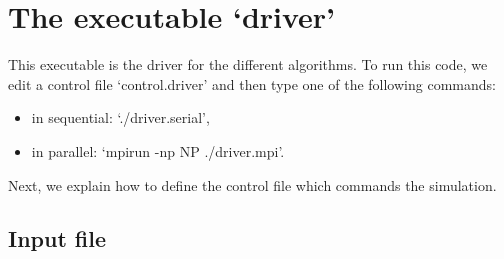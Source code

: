 \documentclass[11pt]{article}
\begin{document}
\section{The executable `driver'}
 
This executable is the driver for the different algorithms.
To run this code, we edit a control file `control.driver' and 
then type one of the following commands:
\begin{itemize}
\item in sequential: `./driver.serial',
\item in parallel:  `mpirun -np NP ./driver.mpi'.
\end{itemize}
Next, we explain how to define the control file which commands 
the simulation. 

\subsection{Input file}
\label{subsec:inputDriver}
\end{document}
